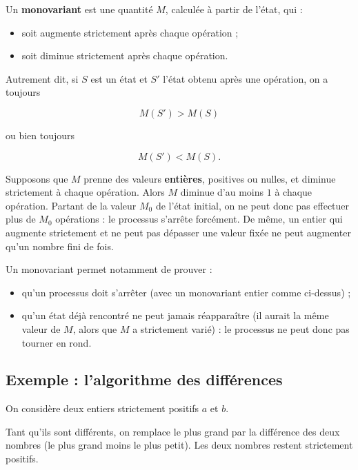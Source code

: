 \documentclass[11pt]{article}
\begin{document}
\begin{definition}[Monovariant]
Un \textbf{monovariant} est une quantité \(M\), calculée à partir de l'état,
qui :

\begin{itemize}
    \item soit augmente strictement après chaque opération ;
    \item soit diminue strictement après chaque opération.
\end{itemize}

Autrement dit, si \(S\) est un état et \(S'\) l'état obtenu après une
opération, on a toujours

\[
\boxed{
M(S')>M(S)
}
\]

ou bien toujours

\[
\boxed{
M(S')<M(S).
}
\]
\end{definition}

Supposons que \(M\) prenne des valeurs \textbf{entières}, positives ou nulles,
et diminue strictement à chaque opération. Alors \(M\) diminue d'au moins
\(1\) à chaque opération. Partant de la valeur \(M_0\) de l'état initial, on
ne peut donc pas effectuer plus de \(M_0\) opérations : le processus
s'arrête forcément. De même, un entier qui augmente strictement et ne peut
pas dépasser une valeur fixée ne peut augmenter qu'un nombre fini de fois.

Un monovariant permet notamment de prouver :

\begin{itemize}
    \item qu'un processus doit s'arrêter (avec un monovariant entier comme
    ci-dessus) ;
    \item qu'un état déjà rencontré ne peut jamais réapparaître (il aurait la
    même valeur de \(M\), alors que \(M\) a strictement varié) : le processus
    ne peut donc pas tourner en rond.
\end{itemize}

\subsection{Exemple : l'algorithme des différences}\label{sec:algorithme-differences}

On considère deux entiers strictement positifs \(a\) et \(b\).

Tant qu'ils sont différents, on remplace le plus grand par la différence des
deux nombres (le plus grand moins le plus petit). Les deux nombres restent
strictement positifs.
\end{document}
